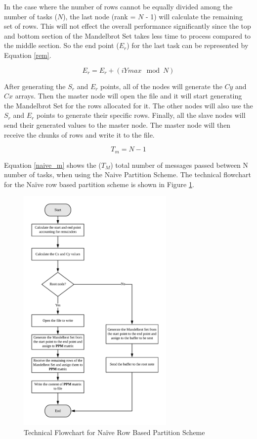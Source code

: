 \documentclass[conference]{IEEEtran}
\begin{document}
			In the case where the number of rows cannot be equally divided among the number of tasks ($N$), the last node (rank = $N$ - 1) will calculate the remaining set of rows. This will not effect the overall performance significantly since the top and bottom section of the Mandelbrot Set takes less time to process compared to the middle section. So the end point ($E_r$) for the last task can be represented by Equation \ref{rem}.
			
			\begin{equation}
			 E_r = E_r + (iYmax \mod N)
			\label{rem}
			\end{equation}
			
			After generating the $S_r$ and $E_r$ points,  all of the nodes will generate the $Cy$ and $Cx$ arrays. Then the master node will open the file and it will start generating the Mandelbrot Set for the rows allocated for it. The other nodes will also use the $S_r$ and $E_r$ points to generate their specific rows. Finally, all the slave nodes will send their generated values to the master node. The master node will then receive the chunks of rows and write it to the file. 
			
			\begin{equation}
			T_m = N - 1
			\label{naive_m}
			\end{equation}
			
			Equation \ref{naive_m} shows the ($T_M$) total number of messages passed between N number of tasks, when using the Naive Partition Scheme. The technical flowchart for the Naïve row based partition scheme is shown in Figure \ref{Naive_1}.
			

			
			\begin{figure}[ht]
			\centering
			\includegraphics[width=3in]{Naive}
			\caption{Technical Flowchart for Naïve Row Based Partition Scheme}
			\label{Naive_1}
			\end{figure}
	
\end{document}
